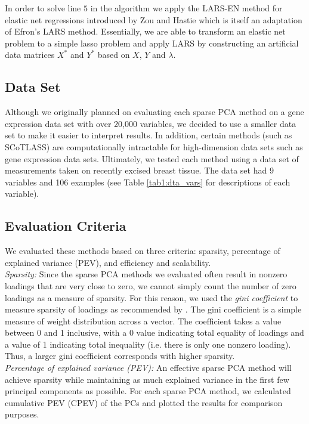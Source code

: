 \documentclass[11pt,letterpaper]{report}
\begin{document}
In order to solve line $5$ in the algorithm we apply the LARS-EN method for elastic net regressions introduced by Zou and Hastie \cite{Zou2005} which is itself an adaptation of Efron's \citeyear{Efron2004} LARS method. Essentially, we are able to transform an elastic net problem to a simple lasso problem and apply LARS by constructing an artificial data matrices $X^*$ and $Y^*$ based on $X$, $Y$ and $\lambda$.

\subsection*{Data Set}

Although we originally planned on evaluating each sparse PCA method on a gene expression data set with over 20,000 variables, we decided to use a smaller data set to make it easier to interpret results. In addition, certain methods (such as SCoTLASS) are computationally intractable for high-dimension data sets such as gene expression data sets. Ultimately, we tested each method using a data set of measurements taken on recently excised breast tissue. The data set had 9 variables and 106 examples (see Table \ref{tab1:dta_vars} for descriptions of each variable). \\

\subsection*{Evaluation Criteria}

We evaluated these methods based on three criteria: sparsity, percentage of explained variance (PEV), and efficiency and scalability.\\

\textit{Sparsity:} Since the sparse PCA methods we evaluated often result in nonzero loadings that are very close to zero, we cannot simply count the number of zero loadings as a measure of sparsity. For this reason, we used the \textit{gini coefficient} to measure sparsity of loadings as recommended by . The gini coefficient is a simple measure of weight distribution across a vector. The coefficient takes a value between 0 and 1 inclusive, with a 0 value indicating total equality of loadings and a value of 1 indicating total inequality (i.e. there is only one nonzero loading). Thus, a larger gini coefficient corresponds with higher sparsity. \\

\textit{Percentage of explained variance (PEV):} An effective sparse PCA method will achieve sparsity while maintaining as much explained variance in the first few principal components as possible. For each sparse PCA method, we calculated cumulative PEV (CPEV) of the PCs and plotted the results for comparison purposes. \\
\end{document}
